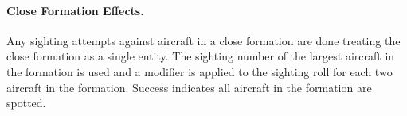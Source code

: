 \paragraph{Close Formation Effects.} Any sighting attempts against aircraft in a close formation are done treating the close formation as a single entity. The sighting number of the largest aircraft in the formation is used and a  modifier is applied to the sighting roll for each two aircraft in the formation. Success indicates all aircraft in the formation are spotted.
